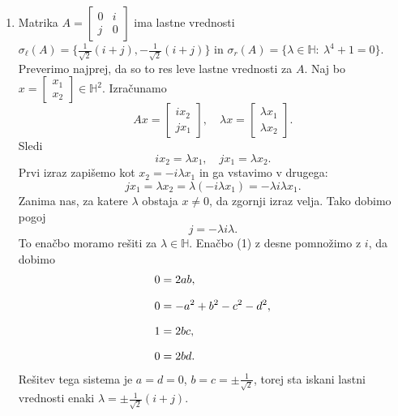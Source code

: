 \documentclass[mat1, tisk]{fmfdelo}
\numberwithin{equation}{section}
\begin{document}
\begin{zgled}
\begin{enumerate}
        \item Matrika
        $A =
        \begin{bmatrix}
            0 & i\\
            j & 0
        \end{bmatrix}
        $
        ima lastne vrednosti $\sigma_{\ell}(A) = \{\frac{1}{\sqrt{2}}(i + j), - \frac{1}{\sqrt{2}}(i + j)\}$ in $\sigma_{r}(A) = \{\lambda \in \mathbb{H}: \: \lambda^4 + 1 = 0\}$.
        Preverimo najprej, da so to res leve lastne vrednosti za $A$. Naj bo $x = \begin{bmatrix}x_1 \\ x_2\end{bmatrix} \in \mathbb{H}^2$.
        Izračunamo
        \[
        A x 
        =
        \begin{bmatrix}
        i x_2 \\ j x_1
        \end{bmatrix},
        \quad
        \lambda x =
        \begin{bmatrix}
        \lambda x_1 \\ \lambda x_2
        \end{bmatrix}.
        \]
        Sledi
        $$i x_2 = \lambda x_1, \quad
                j x_1 = \lambda x_2.$$
        Prvi izraz zapišemo kot
        $
        x_2 = -i \lambda x_1
        $
        in ga vstavimo v drugega:
        \[
        j x_1 = \lambda x_2 = \lambda(- i \lambda x_1) = -\lambda i \lambda x_1.
        \]
        Zanima nas, za katere $\lambda$ obstaja $x \neq 0$, da zgornji izraz velja. Tako dobimo pogoj
        \begin{equation}\tag{1}
            j = -\lambda i \lambda.
        \end{equation}
        To enačbo moramo rešiti za $\lambda \in \mathbb{H}$.  
        Enačbo (1) z desne pomnožimo z $i$, da dobimo
        \begin{equation*}
            \setlength{\jot}{10pt}
            \begin{aligned}
                0 &= 2ab, \\
                0 &= -a^2 + b^2 -c^2 -d^2, \\
                1 &= 2bc, \\
                0 &= 2bd.
            \end{aligned}
        \end{equation*}
        Rešitev tega sistema je $a = d = 0$, $b = c = \pm \frac{1}{\sqrt{2}}$, torej sta iskani lastni vrednosti enaki
        $\lambda = \pm \frac{1}{\sqrt{2}}(i + j)$.

\end{enumerate}
\end{zgled}
\end{document}
